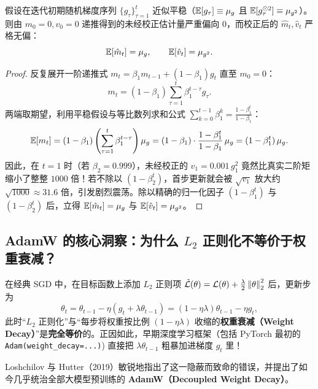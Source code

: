 \begin{thmBox}
\begin{proposition}
\label{prop:adam-bias}
假设在迭代初期随机梯度序列 $\{g_\tau\}_{\tau=1}^t$ 近似平稳（$\mathbb{E}[g_\tau] \equiv \mu_g$ 且 $\mathbb{E}[g_\tau^{\odot 2}] \equiv \mu_{g^2}$）。则由 $m_0 = 0, v_0 = 0$ 递推得到的未经校正估计量严重偏向 $0$，而校正后的 $\hat{m}_t, \hat{v}_t$ 严格无偏：
\[
  \mathbb{E}[\hat{m}_t] = \mu_g, \qquad \mathbb{E}[\hat{v}_t] = \mu_{g^2}.
\]
\end{proposition}
\begin{proof}
反复展开一阶递推式 $m_t = \beta_1 m_{t-1} + (1-\beta_1) g_t$ 直至 $m_0 = 0$：
\[
  m_t = (1 - \beta_1) \sum_{\tau=1}^{t} \beta_1^{t-\tau} g_\tau.
\]
两端取期望，利用平稳假设与等比数列求和公式 $\sum_{k=0}^{t-1} \beta_1^k = \frac{1 - \beta_1^t}{1 - \beta_1}$：
\[
  \mathbb{E}[m_t] = (1 - \beta_1) \left(\sum_{\tau=1}^{t} \beta_1^{t-\tau}\right) \mu_g
  = (1 - \beta_1) \cdot \frac{1 - \beta_1^t}{1 - \beta_1}\,\mu_g
  = (1 - \beta_1^t)\,\mu_g.
\]
因此，在 $t = 1$ 时（若 $\beta_2 = 0.999$），未经校正的 $v_1 = 0.001\, g_1^2$ 竟然比真实二阶矩缩小了整整 $1000$ 倍！若不除以 $(1 - \beta_2^t)$，首步更新就会被 $\sqrt{v_1}$ 放大约 $\sqrt{1000} \approx 31.6$ 倍，引发剧烈震荡。除以精确的归一化因子 $(1-\beta_1^t)$ 与 $(1-\beta_2^t)$ 后，立得 $\mathbb{E}[\hat{m}_t] = \mu_g$ 与 $\mathbb{E}[\hat{v}_t] = \mu_{g^2}$。
\end{proof}
\end{thmBox}

\subsection{AdamW 的核心洞察：为什么 $L_2$ 正则化不等价于权重衰减？}

在经典 SGD 中，在目标函数上添加 $L_2$ 正则项 $\tilde{\mathcal{L}}(\theta) = \mathcal{L}(\theta) + \frac{\lambda}{2}\left\|\theta\right\|_2^2$ 后，更新步为
\[
  \theta_t = \theta_{t-1} - \eta \left(g_t + \lambda \theta_{t-1}\right) = (1 - \eta\lambda)\theta_{t-1} - \eta g_t,
\]
此时“$L_2$ 正则化”与“每步将权重按比例 $(1-\eta\lambda)$ 收缩的\textbf{权重衰减（Weight Decay）}”是\textbf{完全等价}的。正因如此，早期深度学习框架（包括 PyTorch 最初的 \texttt{Adam(weight\_decay=...)}) 直接把 $\lambda \theta_{t-1}$ 粗暴加进梯度 $g_t$ 里！

Loshchilov 与 Hutter（2019）敏锐地指出了这一隐蔽而致命的错误，并提出了如今几乎统治全部大模型预训练的 \textbf{AdamW（Decoupled Weight Decay）}。


